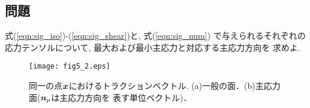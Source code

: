 \documentclass[10pt,a4j]{jbook}
\begin{document}
\subsection{問題}
式(\ref{eqn:sig_iso})-(\ref{eqn:sig_shear})と, 式(\ref{eqn:sig_num})
で与えられるそれぞれの応力テンソルについて, 最大および最小主応力と対応する主応力方向を
求めよ. 
\begin{figure}[h]
	\begin{center}
	\texttt{[image: fig5\_2.eps]} 
	\end{center}
	\caption{
	同一の点$\mbox{\boldmath $x$}$におけるトラクションベクトル.
	(a)一般の面．(b)主応力面($\mbox{\boldmath $n$}_p$は主応力方向を
	表す単位ベクトル)．
	 } 
	\label{fig:fig5_2}
\end{figure}
\end{document}
